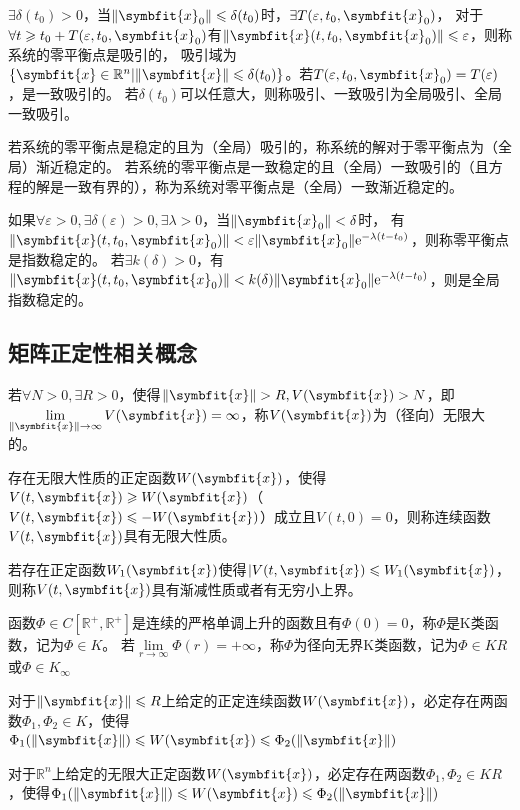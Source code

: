\documentclass[11pt,a4paper]{ctexart}
\newcommand{\e}{{\rm e}}
\newcommand{\bm}{\symbfit}
\begin{document}
        $\exists\delta(t_0)>0$，当$\|\bm{x}_0\|\leqslant\delta(t_0)$时，$\exists T(\varepsilon,t_0,\bm{x}_0)$，
        对于$\forall t\geqslant t_0+T(\varepsilon,t_0,\bm{x}_0)$有$\|\bm{x}(t,t_0,\bm{x}_0)\|\leqslant\varepsilon$，则称系统的零平衡点是吸引的，
        吸引域为$\{\bm{x}\in\mathbb{R}^n|\|\bm{x}\|\leqslant\delta(t_0)\}$。若$T(\varepsilon,t_0,\bm{x}_0)=T(\varepsilon)$，是一致吸引的。
        若$\delta(t_0)$可以任意大，则称吸引、一致吸引为全局吸引、全局一致吸引。

        若系统的零平衡点是稳定的且为（全局）吸引的，称系统的解对于零平衡点为（全局）渐近稳定的。
        若系统的零平衡点是一致稳定的且（全局）一致吸引的（且方程的解是一致有界的），称为系统对零平衡点是（全局）一致渐近稳定的。

        如果$\forall\varepsilon>0,\exists\delta(\varepsilon)>0,\exists\lambda>0$，当$\|\bm{x}_0\|<\delta$时，
        有$\|\bm{x}(t,t_0,\bm{x}_0)\|<\varepsilon\|\bm{x}_0\|\e^{-\lambda(t-t_0)}$，则称零平衡点是指数稳定的。
        若$\exists k(\delta)>0$，有$\|\bm{x}(t,t_0,\bm{x}_0)\|<k(\delta)\|\bm{x}_0\|\e^{-\lambda(t-t_0)}$，则是全局指数稳定的。
    \subsection{矩阵正定性相关概念}
        若$\forall N>0,\exists R>0$，使得$\|\bm{x}\|>R,V(\bm{x})>N$，即$\lim\limits_{\|\bm{x}\|\rightarrow\infty}V(\bm{x})=\infty$，称$V(\bm{x})$为（径向）无限大的。

        存在无限大性质的正定函数$W(\bm{x})$，使得$V(t,\bm{x})\geqslant W(\bm{x})$（$V(t,\bm{x})\leqslant-W(\bm{x})$）成立且$V(t,0)=0$，则称连续函数$V(t,\bm{x})$具有无限大性质。

        若存在正定函数$W_1(\bm{x})$使得$|V(t,\bm{x})\leqslant W_1(\bm{x})$，则称$V(t,\bm{x})$具有渐减性质或者有无穷小上界。

        函数$\Phi\in C[\mathbb{R}^+,\mathbb{R}^+]$是连续的严格单调上升的函数且有$\Phi(0)=0$，称$\Phi$是K类函数，记为$\Phi\in K$。
        若$\lim\limits_{r\rightarrow\infty}\Phi(r)=+\infty$，称$\Phi$为径向无界K类函数，记为$\Phi\in KR$或$\Phi\in K_{\infty}$

        对于$\|\bm{x}\|\leqslant R$上给定的正定连续函数$W(\bm{x})$，必定存在两函数$\Phi_1,\Phi_2\in K$，使得$\Phi_1(\|\bm{x}\|)\leqslant W(\bm{x})\leqslant\Phi_2(\|\bm{x}\|)$

        对于$\mathbb{R}^n$上给定的无限大正定函数$W(\bm{x})$，必定存在两函数$\Phi_1,\Phi_2\in KR$，使得$\Phi_1(\|\bm{x}\|)\leqslant W(\bm{x})\leqslant\Phi_2(\|\bm{x}\|)$
\end{document}

